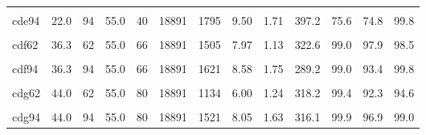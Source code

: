 \begin{landscape}
\begin{longtable}[t]{lrrrrrrrrrrrr}
\cellcolor{gray!6}{cde78} & \cellcolor{gray!6}{22.0} & \cellcolor{gray!6}{78} & \cellcolor{gray!6}{55.0} & \cellcolor{gray!6}{40} & \cellcolor{gray!6}{18891} & \cellcolor{gray!6}{1792} & \cellcolor{gray!6}{9.48} & \cellcolor{gray!6}{1.51} & \cellcolor{gray!6}{359.3} & \cellcolor{gray!6}{91.3} & \cellcolor{gray!6}{90.9} & \cellcolor{gray!6}{99.5}\\
cde94 & 22.0 & 94 & 55.0 & 40 & 18891 & 1795 & 9.50 & 1.71 & 397.2 & 75.6 & 74.8 & 99.8\\
\cellcolor{gray!6}{cdf46} & \cellcolor{gray!6}{36.3} & \cellcolor{gray!6}{46} & \cellcolor{gray!6}{55.0} & \cellcolor{gray!6}{66} & \cellcolor{gray!6}{18891} & \cellcolor{gray!6}{1957} & \cellcolor{gray!6}{10.36} & \cellcolor{gray!6}{1.30} & \cellcolor{gray!6}{376.7} & \cellcolor{gray!6}{96.0} & \cellcolor{gray!6}{97.7} & \cellcolor{gray!6}{74.2}\\
cdf62 & 36.3 & 62 & 55.0 & 66 & 18891 & 1505 & 7.97 & 1.13 & 322.6 & 99.0 & 97.9 & 98.5\\
\cellcolor{gray!6}{cdf78} & \cellcolor{gray!6}{36.3} & \cellcolor{gray!6}{78} & \cellcolor{gray!6}{55.0} & \cellcolor{gray!6}{66} & \cellcolor{gray!6}{18891} & \cellcolor{gray!6}{1371} & \cellcolor{gray!6}{7.26} & \cellcolor{gray!6}{1.87} & \cellcolor{gray!6}{321.5} & \cellcolor{gray!6}{98.2} & \cellcolor{gray!6}{76.0} & \cellcolor{gray!6}{98.1}\\
cdf94 & 36.3 & 94 & 55.0 & 66 & 18891 & 1621 & 8.58 & 1.75 & 289.2 & 99.0 & 93.4 & 99.8\\
\cellcolor{gray!6}{cdg46} & \cellcolor{gray!6}{44.0} & \cellcolor{gray!6}{46} & \cellcolor{gray!6}{55.0} & \cellcolor{gray!6}{80} & \cellcolor{gray!6}{18891} & \cellcolor{gray!6}{1795} & \cellcolor{gray!6}{9.50} & \cellcolor{gray!6}{1.23} & \cellcolor{gray!6}{434.6} & \cellcolor{gray!6}{99.2} & \cellcolor{gray!6}{99.1} & \cellcolor{gray!6}{48.2}\\
cdg62 & 44.0 & 62 & 55.0 & 80 & 18891 & 1134 & 6.00 & 1.24 & 318.2 & 99.4 & 92.3 & 94.6\\
\cellcolor{gray!6}{cdg78} & \cellcolor{gray!6}{44.0} & \cellcolor{gray!6}{78} & \cellcolor{gray!6}{55.0} & \cellcolor{gray!6}{80} & \cellcolor{gray!6}{18891} & \cellcolor{gray!6}{1444} & \cellcolor{gray!6}{7.64} & \cellcolor{gray!6}{1.84} & \cellcolor{gray!6}{328.6} & \cellcolor{gray!6}{99.3} & \cellcolor{gray!6}{79.7} & \cellcolor{gray!6}{97.2}\\
cdg94 & 44.0 & 94 & 55.0 & 80 & 18891 & 1521 & 8.05 & 1.63 & 316.1 & 99.9 & 96.9 & 99.0\\

\end{longtable}
\end{landscape}
